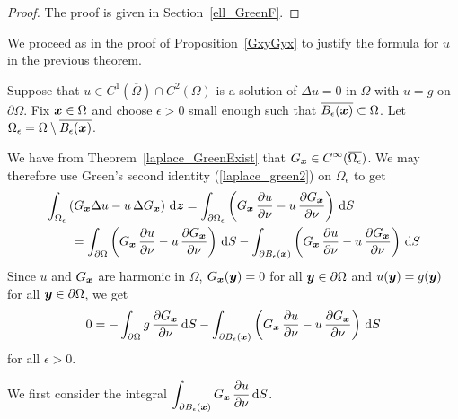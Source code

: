 \begin{proof}
The proof is given in Section~\ref{ell_GreenF}.
\end{proof}

We proceed as in the proof of Proposition~\ref{GxyGyx} to justify the
formula for $u$ in the previous theorem.

Suppose that $\displaystyle u \in C^1(\overline{\Omega}) \cap C^2(\Omega)$ is a
solution of $\Delta u = 0$ in $\Omega$ with $u = g$ on $\partial \Omega$.
Fix ${\bm{x}} \in \Omega$ and choose $\epsilon >0$ small enough such that
$\overline{B_{\epsilon}({\bm{x}})} \subset \Omega$.
Let $\Omega_\epsilon = \Omega \setminus \overline{B_{\epsilon}({\bm{x}})}$.

We have from Theorem~\ref{laplace_GreenExist} that
$\displaystyle G_{{\bm{x}}} \in C^\infty(\overline{\Omega_{\epsilon}})$.
We may therefore use Green's second identity (\ref{laplace_green2}) on
$\Omega_{\epsilon}$ to get
\[
\begin{split}
&\int_{\Omega_{\epsilon}} \left( G_{{\bm{x}}} \Delta u
- u\, \Delta G_{{\bm{x}}} \right) \,\mathrm{d}{{\bm{z}}}
= \int_{\partial \Omega_{\epsilon}} \left( G_{{\bm{x}}}\,\frac{\partial{u}}{\partial \nu} 
- u\,\frac{\partial{G_{{\bm{x}}}}}{\partial \nu} \right) \,\mathrm{d}{S} \\
& \qquad = \int_{\partial \Omega} \left( G_{{\bm{x}}}\,\frac{\partial{u}}{\partial \nu} 
- u\,\frac{\partial{G_{{\bm{x}}}}}{\partial \nu} \right) \,\mathrm{d}{S}
- \int_{\partial B_{\epsilon}({\bm{x}})}
\left( G_{{\bm{x}}}\,\frac{\partial{u}}{\partial \nu} 
- u\,\frac{\partial{G_{{\bm{x}}}}}{\partial \nu} \right) \,\mathrm{d}{S}
\end{split}
\]
Since $u$ and $G_{{\bm{x}}}$ are harmonic in $\Omega$,
$G_{{\bm{x}}}({\bm{y}}) = 0$ for all ${\bm{y}} \in \partial \Omega$ and
$u({\bm{y}}) = g({\bm{y}})$ for all ${\bm{y}} \in \partial \Omega$, we
get
\begin{equation} \label{lapDireq1}
  0 = - \int_{\partial \Omega} g\,\frac{\partial{G_{{\bm{x}}}}}{\partial \nu} \,\mathrm{d}{S}
- \int_{\partial B_{\epsilon}({\bm{x}})}
\left( G_{{\bm{x}}}\,\frac{\partial{u}}{\partial \nu} 
- u\,\frac{\partial{G_{{\bm{x}}}}}{\partial \nu} \right) \,\mathrm{d}{S}
\end{equation}
for all $\epsilon >0$.

We first consider the integral
$\displaystyle \int_{\partial B_{\epsilon}({\bm{x}})}
G_{{\bm{x}}}\,\frac{\partial{u}}{\partial \nu} \,\mathrm{d}{S}$.

